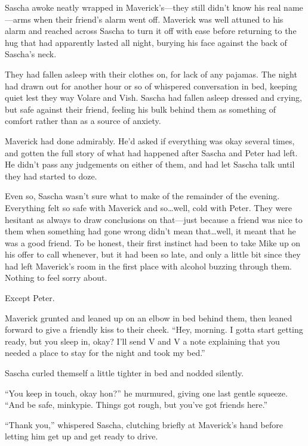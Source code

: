 \secdiv{}

Sascha awoke neatly wrapped in Maverick's---they still didn't know his real name---arms when their friend's alarm went off. Maverick was well attuned to his alarm and reached across Sascha to turn it off with ease before returning to the hug that had apparently lasted all night, burying his face against the back of Sascha's neck.

They had fallen asleep with their clothes on, for lack of any pajamas. The night had drawn out for another hour or so of whispered conversation in bed, keeping quiet lest they way Volare and Vish. Sascha had fallen asleep dressed and crying, but safe against their friend, feeling his bulk behind them as something of comfort rather than as a source of anxiety.

Maverick had done admirably. He'd asked if everything was okay several times, and gotten the full story of what had happened after Sascha and Peter had left. He didn't pass any judgements on either of them, and had let Sascha talk until they had started to doze.

Even so, Sascha wasn't sure what to make of the remainder of the evening. Everything felt so safe with Maverick and so\ldots{}well, cold with Peter. They were hesitant as always to draw conclusions on that---just because a friend was nice to them when something had gone wrong didn't mean that\ldots{}well, it meant that he was a good friend. To be honest, their first instinct had been to take Mike up on his offer to call whenever, but it had been so late, and only a little bit since they had left Maverick's room in the first place with alcohol buzzing through them. Nothing to feel sorry about.

Except Peter.

Maverick grunted and leaned up on an elbow in bed behind them, then leaned forward to give a friendly kiss to their cheek. ``Hey, morning. I gotta start getting ready, but you sleep in, okay? I'll send V and V a note explaining that you needed a place to stay for the night and took my bed.''

Sascha curled themself a little tighter in bed and nodded silently.

``You keep in touch, okay hon?'' he murmured, giving one last gentle squeeze. ``And be safe, minkypie. Things got rough, but you've got friends here.''

``Thank you,'' whispered Sascha, clutching briefly at Maverick's hand before letting him get up and get ready to drive.

